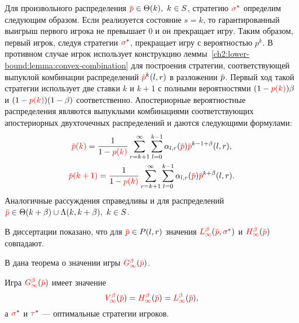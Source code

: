Для произвольного распределения $\pd \in \Theta(k),\ k \in S$, стратегию $\textcolor{red}{\sigma}^*$ определим следующим образом.
Если реализуется состояние $s = k$, то гарантированный выигрыш первого игрока не превышает $0$ и он прекращает игру.
Таким образом, первый игрок, следуя стратегии $\textcolor{red}{\sigma}^*$, прекращает игру с вероятностью $p^k$.
В противном случае игрок использует конструкцию леммы~\ref{ch2:lower-bound:lemma:convex-combination} для построения стратегии, соответствующей выпуклой комбинации распределений $\pd^k(l, r)$ в разложении $\p$.
Первый ход такой стратегии использует две ставки $k$ и $k+1$ с полными вероятностями $(1-\textcolor{red}{p(k)})\beta$ и $(1-\textcolor{red}{p(k)})(1-\beta)$ соответственно.
Апостериорные вероятностные распределения являются выпуклыми комбинациями соответствующих апостериорных двухточечных распределений и даются следующими формулами:
\begin{gather*}
  \pad{k} = \frac{1}{1-\pc{k}} \sum_{r=k+1}^\infty \sum_{l=0}^{k-1} \alpha_{l,r}(\pd) \pd^{k-1+\beta}(l, r), \\
  \pad{k+1} = \frac{1}{1-\pc{k}} \sum_{r=k+1}^\infty \sum_{l=0}^{k-1} \alpha_{l,r}(\pd) \pd^{k+\beta}(l, r).
\end{gather*}
Аналогичные рассуждения справедливы и для распределений $\pd \in \Theta(k+\beta) \cup \Lambda(k, k+\beta),\ k \in S$.

В диссертации показано, что для $\pd \in P(l,r)$ значения $\L{\infty}(\pd, \sigmar^*)$ и $\H{\infty}(\pd)$ совпадают.

В  дана теорема о значении игры $\theG{\infty}(\pd)$.
\begin{theorem}
  \label{ch2:solution:theorem}
  Игра $\theG{\infty}(\pd)$ имеет значение
  \[
    \V{\infty}(\pd) = \H{\infty}(\pd) = \L{\infty}(\pd),
  \]
  а $\textcolor{red}{\sigma}^*$ и $\textcolor{red}{\tau}^*$ --- оптимальные стратегии игроков.
\end{theorem}

